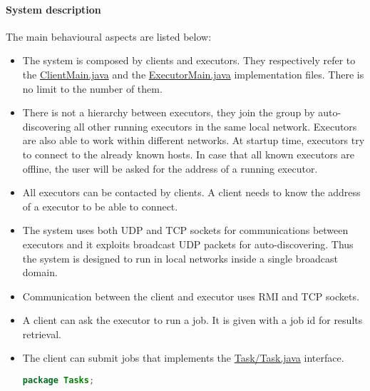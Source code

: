 \documentclass{article}
\begin{document}
\paragraph{System description}
The main behavioural aspects are listed below:
\begin{itemize}
	
	\item The system is composed by clients and executors. They respectively refer to the \href{https://github.com/Alenichel/MartinaNichelini-DistributedJobScheduling/blob/master/src/main/java/Main/ClientMain.java}{ClientMain.java} and the \href{https://github.com/Alenichel/MartinaNichelini-DistributedJobScheduling/blob/master/src/main/java/Main/ExecutorMain.java}{ExecutorMain.java} implementation files. There is no limit to the number of them.
	\item There is not a hierarchy between executors, they join the group by auto-discovering all other running executors in the same local network. Executors are also able to work within different networks. At startup time, executors try to connect to the already known hosts. In case that all known executors are offline, the user will be asked for the address of a running executor.
	\item All executors can be contacted by clients. A client needs to know the address of a executor to be able to connect.
	\item The system uses both UDP and TCP sockets for communications between executors and it exploits broadcast UDP packets for auto-discovering. Thus the system is designed to run in local networks inside a single broadcast domain.
	\item Communication between the client and executor uses RMI and TCP sockets.
	\item A client can ask the executor to run a job. It is given with a job id for results retrieval.	
	\item The client can submit jobs that implements the \href{https://github.com/Alenichel/MartinaNichelini-DistributedJobScheduling/blob/master/src/main/java/Tasks/Task.java}{Task/Task.java} interface.

\begin{file}
\begin{lstlisting}[language=Java]
package Tasks;


\end{lstlisting}
\end{file}
\end{itemize}
\end{document}
